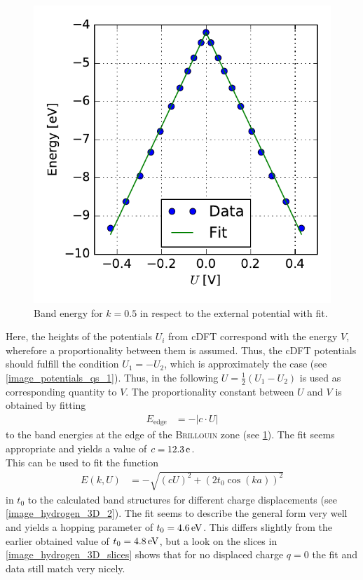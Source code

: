\begin{figure}
\begin{minipage}{0.49\textwidth}
	\includegraphics[width = \textwidth]{Images/Hydrogen/charging/border_energy_q_1}
	\caption{Band energy for $k = 0.5$ in respect to the external potential with fit.}
	\label{image_edge_energy_qs_1}
	\end{minipage}
\end{figure}
Here, the heights of the potentials $U_i$ from cDFT correspond with the energy $V$, wherefore a proportionality between them is assumed. Thus, the cDFT potentials should fulfill the condition $U_1 = - U_2$, which is approximately the case (see \cref{image_potentials_qs_1}). Thus, in the following $U = \frac{1}{2}(U_1 - U_2)$ is used as corresponding quantity to $V$.
The proportionality constant between $U$ and $V$ is obtained by fitting
\begin{align}
	E_\text{edge} &= -\left|c \cdot U\right|
\end{align}
to the band energies at the edge of the \textsc{Brillouin} zone (see \cref{image_edge_energy_qs_1}). The fit seems appropriate and yields a value of $c = \unit[12.3]{e}$.\\
This can be used to fit the function
\begin{align}
	E\left(k, U\right) &= - \sqrt{\left(cU\right)^2 + \left(2t_0\cos(ka)\right)^2}
\end{align}
in $t_0$ to the calculated band structures for different charge displacements (see \cref{image_hydrogen_3D_2}). The fit seems to describe the general form very well and yields a hopping parameter of $t_0 = \unit[4.6]{eV}$. This differs slightly from the earlier obtained value of $t_0 = \unit[4.8]{eV}$, but a look on the slices in \cref{image_hydrogen_3D_slices} shows that for no displaced charge $q = 0$ the fit and data still match very nicely.\\
